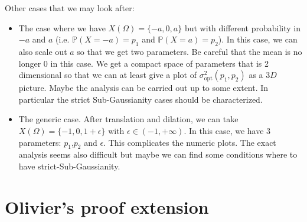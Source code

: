 \documentclass[a4paper, 10pt]{article}
\renewcommand{\P}{\mathbb{P}}
\theoremstyle{definition}
\begin{document}
\medskip

Other cases that we may look after:
\begin{itemize}
    \item The case where we have $X(\Omega)=\{-a,0,a\}$ but with different probability in $-a$ and $a$ (i.e. $\P(X=-a)=p_1$ and $\P(X=a)=p_2$). In this case, we can also scale out $a$ so that we get two parameters. Be careful that the mean is no longer $0$ in this case. We get a compact space of parameters that is 2 dimensional so that we can at least give a plot of $\sigma_{\text{opt}}^2(p_1,p_2)$ as a $3D$ picture. Maybe the analysis can be carried out up to some extent. In particular the strict Sub-Gaussianity cases should be characterized.
    \item The generic case. After translation and dilation, we can take $X(\Omega)=\{-1,0,1+\epsilon\}$ with $\epsilon\in (-1,+\infty)$. In this case, we have $3$ parameters: $p_1$,$p_2$ and $\epsilon$. This complicates the numeric plots. The exact analysis seems also difficult but maybe we can find some conditions where to have strict-Sub-Gaussianity. 
\end{itemize}

\section{Olivier's proof extension}
\end{document}
